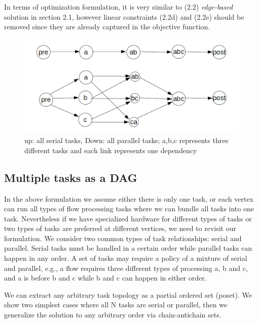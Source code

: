 In terms of optimization formulation, it is very similar to (2.2) \emph{edge-based} solution in section 2.1, however linear constraints (2.2d) and (2.2e) should be removed since they are already captured in the objective function.   



\begin{figure}
 \includegraphics[width=\linewidth]{task.png}
 \caption{up: all serial tasks, Down: all parallel tasks; a,b,c represents three different tasks and each link represents one dependency}
\end{figure}

\subsection{Multiple tasks as a DAG}
In the above formulation we assume either there is only one task, or each vertex can run all types of flow processing tasks where we can bundle all tasks into one task. Nevertheless if we have specialized hardware for different types of tasks or two types of tasks are preferred at different vertices,  we need to revisit our formulation. 
We consider two common types of task relationships: serial and parallel. Serial tasks must be handled in a certain order while parallel tasks can happen in any order. A set of tasks may require a policy of a mixture of serial and parallel, e.g., a flow requires three different types of processing a, b and c, and a is before b and c while b and c can happen in either order. 

We can extract any arbitrary task topology as a partial ordered set (poset). We show two simplest cases where all N tasks are serial or parallel, then we generalize the solution to any arbitrary order via chain-antichain sets.  


